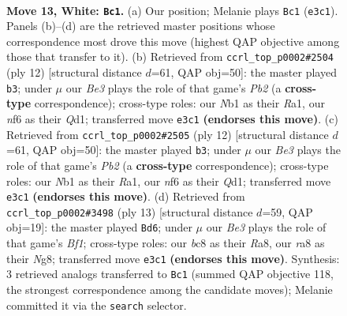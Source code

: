 \documentclass[11pt]{article}
\begin{document}
\begin{figure}[p]\centering
\begin{subfigure}{0.46\textwidth}\centering
\resizebox{\linewidth}{!}{%
\newchessgame
\chessboard[
  setfen={rnbqk2r/8/2pb1np1/pp1p1p2/3P3p/4B1P1/PP2PPBP/RN1QNRK1 w kq - 0 13},
  showmover=false,
  pgfstyle=straightmove, color=movearrow, markmove={e3-c1}
]}
\caption{}
\end{subfigure}\hfill
\begin{subfigure}{0.46\textwidth}\centering
\resizebox{\linewidth}{!}{%
\newchessgame
\chessboard[
  setfen={rnbqk2r/pp4pp/2pbpn2/3p1p2/2PP4/5NP1/PP2PPBP/RNBQ1RK1 w kq - 0 7},
  showmover=false,
  pgfstyle=straightmove, color=movearrow, markmove={b2-b3}
]}
\caption{}
\end{subfigure}
\\[4pt]
\begin{subfigure}{0.46\textwidth}\centering
\resizebox{\linewidth}{!}{%
\newchessgame
\chessboard[
  setfen={rnbqk2r/pp4pp/2pbpn2/3p1p2/2PP4/5NP1/PP2PPBP/RNBQ1RK1 w kq - 0 7},
  showmover=false,
  pgfstyle=straightmove, color=movearrow, markmove={b2-b3}
]}
\caption{}
\end{subfigure}\hfill
\begin{subfigure}{0.46\textwidth}\centering
\resizebox{\linewidth}{!}{%
\newchessgame
\chessboard[
  setfen={r1b1kbnr/ppq2ppp/2n1p3/3p4/3P4/2PB1N1P/PP3PP1/RNBQK2R b KQkq - 1 7},
  showmover=false,
  pgfstyle=straightmove, color=movearrow, markmove={f8-d6}
]}
\caption{}
\end{subfigure}
\caption{\textbf{Move 13, White: \texttt{Bc1}.} (a) Our position; Melanie plays \texttt{Bc1} (\texttt{e3c1}). Panels (b)--(d) are the retrieved master positions whose correspondence most drove this move (highest QAP objective among those that transfer to it). (b) Retrieved from \texttt{ccrl\_top\_p0002\#2504} (ply 12) [structural distance $d$=61, QAP obj=50]: the master played \texttt{b3}; under $\mu$ our \emph{Be3} plays the role of that game's \emph{Pb2} (a \textbf{cross-type} correspondence); cross-type roles: our \emph{N}b1 as their \emph{R}a1, our \emph{n}f6 as their \emph{Q}d1; transferred move \texttt{e3c1} \textbf{(endorses this move)}. (c) Retrieved from \texttt{ccrl\_top\_p0002\#2505} (ply 12) [structural distance $d$=61, QAP obj=50]: the master played \texttt{b3}; under $\mu$ our \emph{Be3} plays the role of that game's \emph{Pb2} (a \textbf{cross-type} correspondence); cross-type roles: our \emph{N}b1 as their \emph{R}a1, our \emph{n}f6 as their \emph{Q}d1; transferred move \texttt{e3c1} \textbf{(endorses this move)}. (d) Retrieved from \texttt{ccrl\_top\_p0002\#3498} (ply 13) [structural distance $d$=59, QAP obj=19]: the master played \texttt{Bd6}; under $\mu$ our \emph{Be3} plays the role of that game's \emph{Bf1}; cross-type roles: our \emph{b}c8 as their \emph{R}a8, our \emph{r}a8 as their \emph{N}g8; transferred move \texttt{e3c1} \textbf{(endorses this move)}. Synthesis: 3 retrieved analogs transferred to \texttt{Bc1} (summed QAP objective 118, the strongest correspondence among the candidate moves); Melanie committed it via the \texttt{search} selector.}
\label{fig:thought-m24}
\end{figure}
\end{document}
